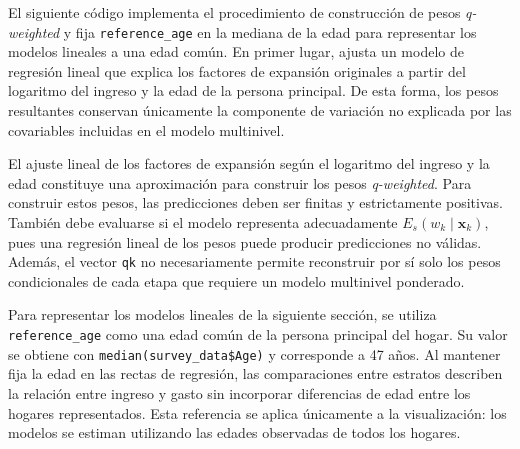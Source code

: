 \documentclass[
  spanish,
  11pt,
  letterpaper,
  oneside,
  open=any]{scrbook}
\newenvironment{Shaded}{\begin{snugshade}}{\end{snugshade}}
\newcommand{\AttributeTok}[1]{\textcolor[rgb]{0.40,0.45,0.13}{#1}}
\newcommand{\FunctionTok}[1]{\textcolor[rgb]{0.28,0.35,0.67}{#1}}
\newcommand{\NormalTok}[1]{\textcolor[rgb]{0.00,0.23,0.31}{#1}}
\newcommand{\OtherTok}[1]{\textcolor[rgb]{0.00,0.23,0.31}{#1}}
\newcommand{\SpecialCharTok}[1]{\textcolor[rgb]{0.37,0.37,0.37}{#1}}
\begin{document}
El siguiente código implementa el procedimiento de construcción de pesos
\emph{q-weighted} y fija \texttt{reference\_age} en la mediana de la
edad para representar los modelos lineales a una edad común. En primer
lugar, ajusta un modelo de regresión lineal que explica los factores de
expansión originales a partir del logaritmo del ingreso y la edad de la
persona principal. De esta forma, los pesos resultantes conservan
únicamente la componente de variación no explicada por las covariables
incluidas en el modelo multinivel.

\begin{Shaded}
\end{Shaded}

El ajuste lineal de los factores de expansión según el logaritmo del
ingreso y la edad constituye una aproximación para construir los pesos
\emph{q-weighted}. Para construir estos pesos, las predicciones deben
ser finitas y estrictamente positivas. También debe evaluarse si el
modelo representa adecuadamente \(E_s(w_k\mid\mathbf{x}_k)\), pues una
regresión lineal de los pesos puede producir predicciones no válidas.
Además, el vector \texttt{qk} no necesariamente permite reconstruir por
sí solo los pesos condicionales de cada etapa que requiere un modelo
multinivel ponderado.

Para representar los modelos lineales de la siguiente sección, se
utiliza \texttt{reference\_age} como una edad común de la persona
principal del hogar. Su valor se obtiene con
\texttt{median(survey\_data\$Age)} y corresponde a 47 años. Al mantener
fija la edad en las rectas de regresión, las comparaciones entre
estratos describen la relación entre ingreso y gasto sin incorporar
diferencias de edad entre los hogares representados. Esta referencia se
aplica únicamente a la visualización: los modelos se estiman utilizando
las edades observadas de todos los hogares.
\end{document}
